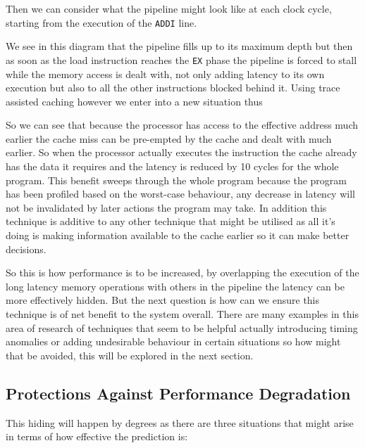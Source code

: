 Then we can consider what the pipeline might look like at each clock cycle, starting from the execution of the \texttt{ADDI} line.


We see in this diagram that the pipeline fills up to its maximum depth but then as soon as the load instruction reaches the \texttt{EX} phase the pipeline is forced to stall while the memory access is dealt with, not only adding latency to its own execution but also to all the other instructions blocked behind it. Using trace assisted caching however we enter into a new situation thus


So we can see that because the processor has access to the effective address much earlier the cache miss can be pre-empted by the cache and dealt with much earlier. So when the processor actually executes the instruction the cache already has the data it requires and the latency is reduced by 10 cycles for the whole program. This benefit sweeps through the whole program because the program has been profiled based on the worst-case behaviour, any decrease in latency will not be invalidated by later actions the program may take. In addition this technique is additive to any other technique that might be utilised as all it's doing is making information available to the cache earlier so it can make better decisions. 

So this is how performance is to be increased, by overlapping the execution of the long latency memory operations with others in the pipeline the latency can be more effectively hidden. But the next question is how can we ensure this technique is of net benefit to the system overall. There are many examples in this area of research of techniques that seem to be helpful actually introducing timing anomalies or adding undesirable behaviour in certain situations so how might that be avoided, this will be explored in the next section.

\subsection{Protections Against Performance Degradation}

This hiding will happen by degrees as there are three situations that might arise in terms of how effective the prediction is:

